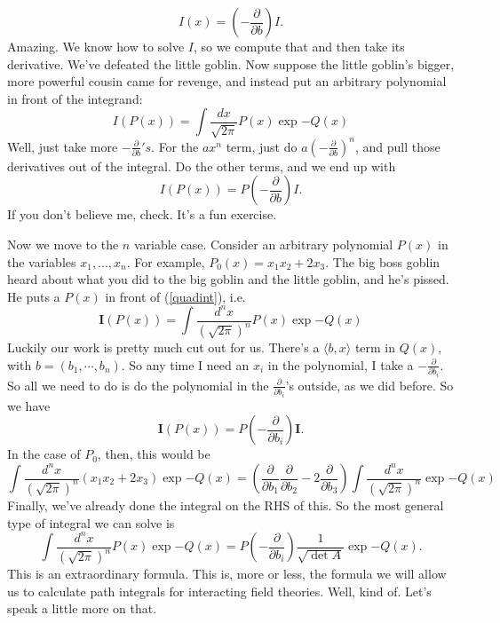 \documentclass[main.tex]{subfiles}
\begin{document}
\begin{equation} \label{amazing}
I(x) = \left( -\frac{\partial}{\partial b}\right) I.
\end{equation}
Amazing. We know how to solve $I$, so we compute that and then take its derivative. We've defeated the little goblin. Now suppose the little goblin's bigger, more powerful cousin came for revenge, and instead put an arbitrary polynomial in front of the integrand:
\[
I(P(x)) = \int \frac{dx}{\sqrt{2\pi}} P(x) \exp{-Q(x)}
\]
Well, just take more $-\frac{\partial}{\partial b}'s$. For the $a x^n$ term, just do $a (-\frac{\partial}{\partial b})^n$, and pull those derivatives out of the integral. Do the other terms, and we end up with
\[
I(P(x)) = P\left( - \frac{\partial}{\partial b} \right) I.
\]
If you don't believe me, check. It's a fun exercise.

Now we move to the $n$ variable case. Consider an arbitrary polynomial $P(x)$ in the variables $x_1,...,x_n$. For example, $P_0 (x) = x_1 x_2 + 2 x_3$. The big boss goblin heard about what you did to the big goblin and the little goblin, and he's pissed. He puts a $P(x)$ in front of (\ref{quadint}), i.e. 
\[
\mathbf{I} (P(x)) = \int \frac{d^n x}{(\sqrt{2\pi})^n} P(x) \exp{-Q(x)}
\]
Luckily our work is pretty much cut out for us. There's a $\langle b,x \rangle$ term in $Q(x)$, with $b = (b_1, \cdots, b_n)$. So any time I need an $x_i$ in the polynomial, I take a $-\frac{\partial}{\partial b_i}$. So all we need to do is do the polynomial in the $\frac{\partial}{\partial b_i}$'s outside, as we did before. So we have
\begin{equation} \label{bbg}
\boxed{\mathbf{I} (P(x)) = P\left(-\frac{\partial}{\partial b_i}\right) \mathbf{I}.}
\end{equation}
In the case of $P_0$, then, this would be
\[
\int \frac{d^n x}{(\sqrt{2\pi})^n} (x_1 x_2 + 2x_3) \exp{-Q(x)} =
\left(\frac{\partial}{\partial b_1} \frac{\partial}{\partial b_2} - 2 \frac{\partial}{\partial b_3} \right) \int \frac{d^n x}{(\sqrt{2\pi})^n} \exp{-Q(x)}
\]
Finally, we've already done the integral on the RHS of this. So the most general type of integral we can solve is
\begin{equation} \label{bigdaddy}
\boxed{\int \frac{d^n x}{(\sqrt{2\pi})^n} P(x) \exp{-Q(x)} = P\left(-\frac{\partial}{\partial b_i}\right)  \frac{1}{\sqrt{\det A}} \exp{-Q(x)}.}
\end{equation}
This is an extraordinary formula. This is, more or less, the formula we will allow us to calculate path integrals for interacting field theories. Well, kind of. Let's speak a little more on that.
\end{document}
